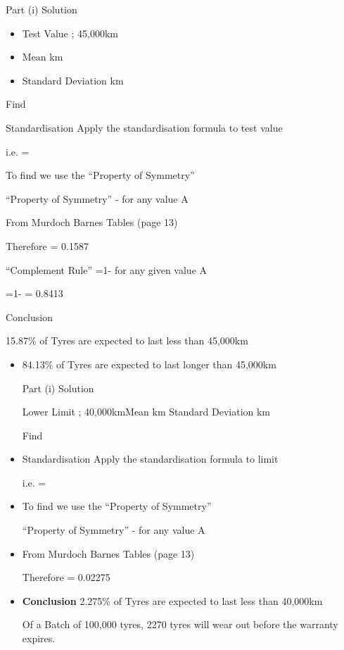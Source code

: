 Part (i) Solution

\begin{itemize}
\item Test Value ; 45,000km
\item Mean km
\item Standard Deviation km
\end{itemize}


Find  

Standardisation
Apply the standardisation formula to test value


i.e.  = 

To find   we use the “Property of Symmetry”

“Property of Symmetry” -   for any value A

From Murdoch Barnes Tables (page 13)  

Therefore   = 0.1587 

“Complement Rule” =1-  for any given value A

=1-  = 0.8413

Conclusion

15.87\% of Tyres are expected to last less than 45,000km

\begin{itemize}
\item 84.13\% of Tyres are expected to last longer than 45,000km




Part (i) Solution

Lower Limit ; 40,000kmMean km
Standard Deviation km

Find  

\item Standardisation
Apply the standardisation formula to limit


i.e.  = 

\item To find   we use the “Property of Symmetry”

“Property of Symmetry” -   for any value A


\item From Murdoch Barnes Tables (page 13)  

Therefore   = 0.02275 

\item \textbf{Conclusion}
2.275\% of Tyres are expected to last less than 40,000km

Of a Batch of 100,000 tyres,  2270 tyres will wear out before the warranty expires.
\end{itemize}


